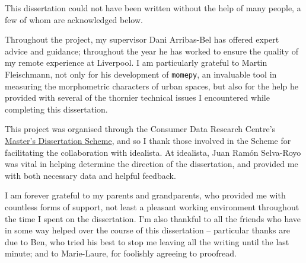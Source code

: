 \documentclass[a4paper, nobind]{templates/ociamthesis}
\begin{document}

\begin{romanpages}

\maketitle


\begin{acknowledgements}
 	This dissertation could not have been written without the help of many people, a few of whom are acknowledged below.

  Throughout the project, my supervisor Dani Arribas-Bel has offered expert advice and guidance; throughout the year he has worked to ensure the quality of my remote experience at Liverpool. I am particularly grateful to Martin Fleischmann, not only for his development of \texttt{momepy}, an invaluable tool in measuring the morphometric characters of urban spaces, but also for the help he provided with several of the thornier technical issues I encountered while completing this dissertation.

  This project was organised through the Consumer Data Research Centre's \href{https://www.cdrc.ac.uk/education-and-training/masters-dissertation-scheme/}{Master's Dissertation Scheme}, and so I thank those involved in the Scheme for facilitating the collaboration with idealista. At idealista, Juan Ramón Selva-Royo was vital in helping determine the direction of the dissertation, and provided me with both necessary data and helpful feedback.

  I am forever grateful to my parents and grandparents, who provided me with countless forms of support, not least a pleasant working environment throughout the time I spent on the dissertation. I'm also thankful to all the friends who have in some way helped over the course of this dissertation -- particular thanks are due to Ben, who tried his best to stop me leaving all the writing until the last minute; and to Marie-Laure, for foolishly agreeing to proofread.


\end{acknowledgements}
\end{romanpages}
\end{document}

